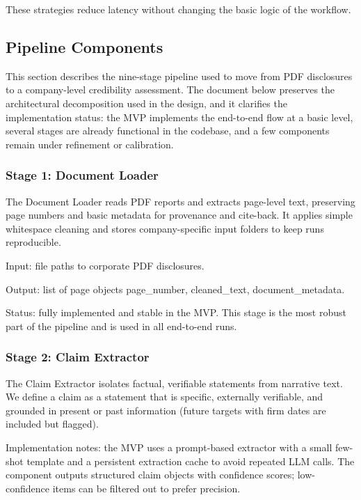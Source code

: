 These strategies reduce latency without changing the basic logic of the workflow.

\subsection{Pipeline Components}

This section describes the nine-stage pipeline used to move from PDF disclosures to a company-level credibility assessment. The document below preserves the architectural decomposition used in the design, and it clarifies the implementation status: the MVP implements the end-to-end flow at a basic level, several stages are already functional in the codebase, and a few components remain under refinement or calibration.

\subsubsection{Stage 1: Document Loader}

The Document Loader reads PDF reports and extracts page-level text, preserving page numbers and basic metadata for provenance and cite-back. It applies simple whitespace cleaning and stores company-specific input folders to keep runs reproducible.

Input: file paths to corporate PDF disclosures.

Output: list of page objects {page_number, cleaned_text, document_metadata}.

Status: fully implemented and stable in the MVP. This stage is the most robust part of the pipeline and is used in all end-to-end runs.

\subsubsection{Stage 2: Claim Extractor}

The Claim Extractor isolates factual, verifiable statements from narrative text. We define a claim as a statement that is specific, externally verifiable, and grounded in present or past information (future targets with firm dates are included but flagged).

Implementation notes: the MVP uses a prompt-based extractor with a small few-shot template and a persistent extraction cache to avoid repeated LLM calls. The component outputs structured claim objects with confidence scores; low-confidence items can be filtered out to prefer precision.

